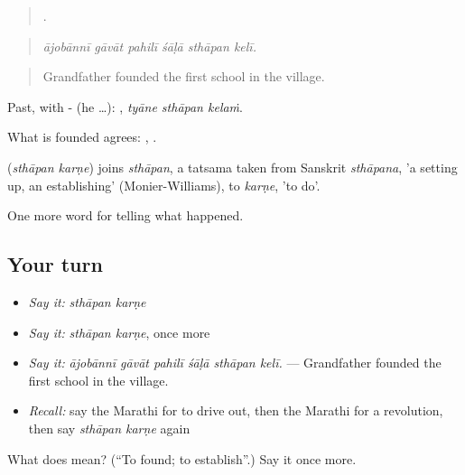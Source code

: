 \begin{quote}
     .
\end{quote}

\begin{quote}
\emph{ājobānnī gāvāt pahilī śāḷā sthāpan kelī.}
\end{quote}

\begin{quote}
Grandfather founded the first school in the village.
\end{quote}

Past, with - (he …):   , \emph{tyāne sthāpan kelaṁ}.

What is founded agrees:   ,   .

\begin{cousinweb}
\textbf{ } (\emph{sthāpan karṇe}) joins \emph{sthāpan}, a tatsama taken from Sanskrit \emph{sthāpana}, 'a setting up, an establishing' (Monier-Williams), to \emph{karṇe}, 'to do'.
\end{cousinweb}

\begin{grammarlens}[title={What you've built}]
One more word for telling what happened.
\end{grammarlens}

\subsection*{Your turn}
\begin{itemize}
\raggedright
  \item \emph{Say it:} \emph{sthāpan karṇe}
  \item \emph{Say it:} \emph{sthāpan karṇe}, once more
  \item \emph{Say it:} \emph{ājobānnī gāvāt pahilī śāḷā sthāpan kelī.} — Grandfather founded the first school in the village.
  \item \emph{Recall:} say the Marathi for to drive out, then the Marathi for a revolution, then say \emph{sthāpan karṇe} again
\end{itemize}

\begin{tcolorbox}[breakable,colback=teal!4,colframe=teal!35!black,title={Before you move on}]
What does   mean? (\textquotedblleft{}To found; to establish\textquotedblright{}.) Say it once more.
\end{tcolorbox}
